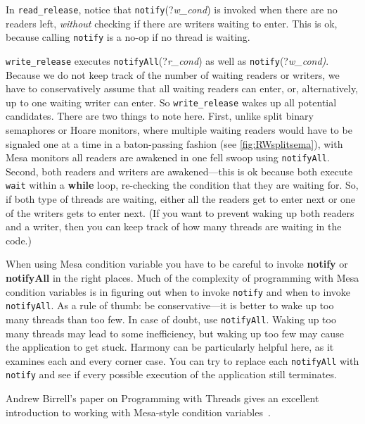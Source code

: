 \documentclass{report}
\begin{document}
In \texttt{read\_release}, notice that \texttt{notify}(?\textit{w\_cond})
is invoked when there are no readers left, \emph{without} checking
if there are writers waiting to enter.  This is
ok, because calling \texttt{notify} is a no-op if no thread is
waiting.

\texttt{write\_release} executes \texttt{notifyAll}(?\textit{r\_cond})
as well as \texttt{notify}(?\textit{w\_cond)}.  Because we
do not keep track of the number of waiting readers or writers, we
have to conservatively assume that all waiting readers can enter,
or, alternatively, up to one waiting writer can enter.  So
\texttt{write\_release} wakes up all potential candidates.  There
are two things to note here.  First, unlike split binary semaphores
or Hoare monitors, where multiple waiting readers would have to be
signaled one at a time in a baton-passing fashion (see
\autoref{fig:RWsplitsema}), with Mesa monitors all readers are
awakened in one fell swoop using \texttt{notifyAll}.  Second, both
readers and writers are awakened---this is ok because both execute
\texttt{wait} within a \textbf{while} loop, re-checking the condition
that they are waiting for.  So, if both type of threads are waiting,
either all the readers get to enter next or one of the writers gets
to enter next.  (If you want to prevent waking up both readers and
a writer, then you can keep track of how many threads are waiting
in the code.)

When using Mesa condition variable you have to be careful to invoke
\textbf{notify} or \textbf{notifyAll} in the right places.
Much of the complexity of programming with Mesa condition variables
is in figuring out when to invoke \texttt{notify} and when to invoke
\texttt{notifyAll}.  As a rule of thumb: be conservative---it is
better to wake up too many threads than too few.
In case of doubt, use \texttt{notifyAll}.
Waking up too
many threads may lead to some inefficiency, but waking up too few
may cause the application to get stuck.  Harmony can be particularly
helpful here, as it examines each and every corner case.
You can try to replace each \texttt{notifyAll} with \texttt{notify} and see
if every possible execution of the application still terminates.

Andrew Birrell's paper on Programming with Threads gives an excellent
introduction to working with Mesa-style condition variables~\cite{Birrell89}.
\end{document}
